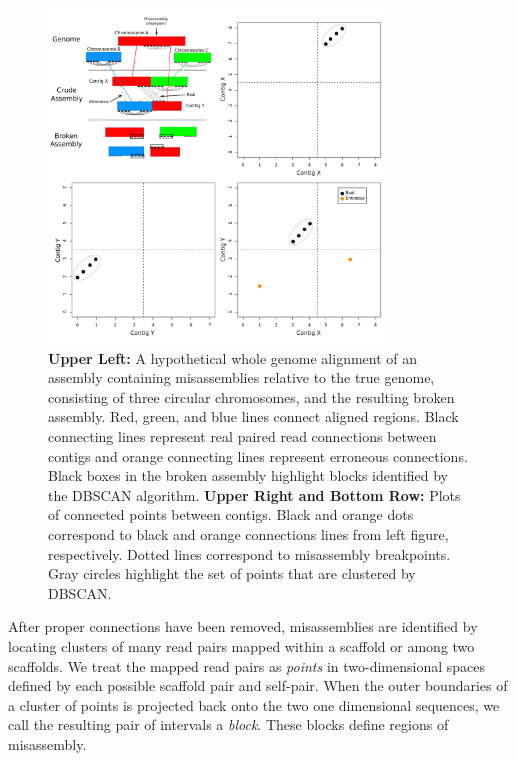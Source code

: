 \documentclass{bioinfo}
\begin{document}
\begin{figure}[t]
\includegraphics[width=3.5in]{fish-qc.pdf}
\vspace{-1cm}
\caption{\textbf{Upper Left:}  A hypothetical whole genome alignment of an assembly containing misassemblies relative to the true genome,
consisting of three circular chromosomes, and the 
resulting broken assembly. Red, green, and blue lines connect aligned regions. Black connecting lines represent real paired read 
connections between contigs and orange connecting lines represent erroneous connections. Black boxes in the broken assembly highlight
blocks identified by the DBSCAN algorithm. \textbf{Upper Right and Bottom Row:} Plots of connected points between contigs. Black and orange dots 
correspond to black and orange connections lines from left figure, respectively. Dotted lines correspond
to misassembly breakpoints. Gray circles highlight the set of points that are clustered by DBSCAN. }\label{fig:02}
\end{figure}

After proper connections have been removed, misassemblies are identified by locating clusters of many read pairs mapped within
a scaffold or among two scaffolds. We treat the mapped read pairs as \emph{points} in
two-dimensional spaces defined by each possible scaffold pair and self-pair. When the outer boundaries of a cluster of points
is projected back onto the two one dimensional sequences, we call the resulting pair of intervals a \emph{block}.
These blocks define regions of misassembly.
\end{document}
